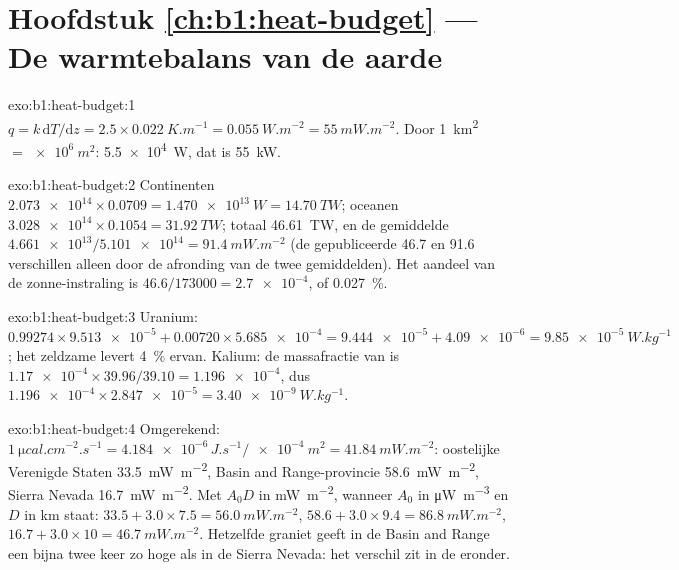 \section*{Hoofdstuk \ref{ch:b1:heat-budget} --- De warmtebalans van de aarde}

\begin{solution}{exo:b1:heat-budget:1}
$q = k\,\mathrm dT/\mathrm dz = 2.5\times\qty{0.022}{K.m^{-1}} =
\qty{0.055}{W.m^{-2}} = \qty{55}{mW.m^{-2}}$. Door \qty{1}{km^2} $=
\qty{e6}{m^2}$: \qty{5.5e4}{W}, dat is \qty{55}{kW}.
\end{solution}

\begin{solution}{exo:b1:heat-budget:2}
Continenten $\num{2.073e14}\times0.0709 = \qty{1.470e13}{W} = \qty{14.70}{TW}$;
oceanen $\num{3.028e14}\times0.1054 = \qty{31.92}{TW}$; totaal \qty{46.61}{TW}, en
de gemiddelde  $\num{4.661e13}/\num{5.101e14} = \qty{91.4}{mW.m^{-2}}$ (de
gepubliceerde 46.7 en 91.6 verschillen alleen door de afronding van de twee gemiddelden). Het
aandeel van de zonne-instraling is $46.6/173000 = \num{2.7e-4}$, of
\qty{0.027}{\percent}.
\end{solution}

\begin{solution}{exo:b1:heat-budget:3}
Uranium: $0.99274\times\num{9.513e-5} + 0.00720\times\num{5.685e-4} =
\num{9.444e-5} + \num{4.09e-6} = \qty{9.85e-5}{W.kg^{-1}}$; het zeldzame
 levert \qty{4}{\percent} ervan. Kalium: de massafractie van
 is $\num{1.17e-4}\times39.96/39.10 = \num{1.196e-4}$, dus
$\num{1.196e-4}\times\num{2.847e-5} = \qty{3.40e-9}{W.kg^{-1}}$.
\end{solution}

\begin{solution}{exo:b1:heat-budget:4}
Omgerekend: $\qty{1}{\micro cal.cm^{-2}.s^{-1}} = \num{4.184e-6}\,\unit{J.s^{-1}}/\qty{e-4}{m^2}
= \qty{41.84}{mW.m^{-2}}$: oostelijke Verenigde Staten \qty{33.5}{mW.m^{-2}}, Basin and
Range-provincie \qty{58.6}{mW.m^{-2}}, Sierra Nevada \qty{16.7}{mW.m^{-2}}. Met $A_0D$ in
\unit{mW.m^{-2}}, wanneer $A_0$ in \unit{\micro W.m^{-3}} en $D$ in \unit{km} staat:
$33.5 + 3.0\times7.5 = \qty{56.0}{mW.m^{-2}}$, $58.6 + 3.0\times9.4 =
\qty{86.8}{mW.m^{-2}}$, $16.7 + 3.0\times10 = \qty{46.7}{mW.m^{-2}}$. Hetzelfde
graniet geeft in de Basin and Range een bijna twee keer zo hoge  als in de Sierra Nevada: het verschil zit in de  eronder.
\end{solution}

